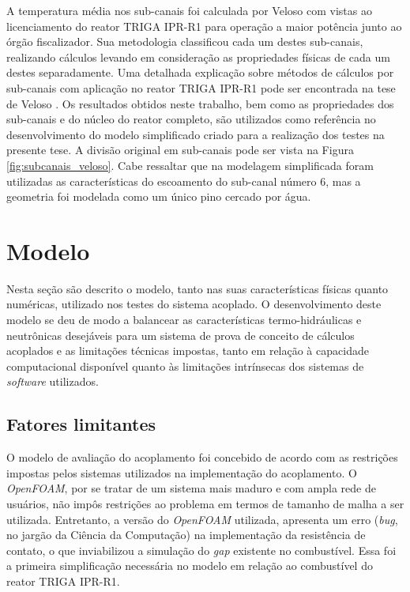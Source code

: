 A temperatura média nos sub-canais foi calculada por Veloso \cite[Capítulo~8]{Veloso2005} com vistas ao licenciamento
do reator TRIGA IPR-R1 para operação a maior potência junto ao órgão fiscalizador. Sua metodologia
classificou cada um destes sub-canais, realizando cálculos levando
em consideração as propriedades físicas de cada um destes separadamente. Uma detalhada
explicação sobre métodos de cálculos por sub-canais com aplicação no reator TRIGA IPR-R1
pode ser encontrada na tese de Veloso \cite{Veloso2004}. Os resultados obtidos neste
trabalho, bem como as propriedades dos sub-canais e do núcleo do reator completo, são utilizados
como referência no desenvolvimento do modelo simplificado criado para a realização dos testes na
presente tese. A divisão original em sub-canais pode ser vista na Figura \ref{fig:subcanais_veloso}. Cabe
ressaltar que na modelagem simplificada foram utilizadas as características do escoamento do
sub-canal número $6$, mas a geometria foi modelada como um único pino cercado por água.

\section{Modelo}
%
%

Nesta seção são descrito o modelo, tanto nas suas características físicas quanto numéricas, utilizado
nos testes do sistema acoplado.
O desenvolvimento deste modelo se deu de modo a balancear as características termo-hidráulicas
e neutrônicas desejáveis para um sistema de prova de conceito de cálculos acoplados
e as limitações técnicas impostas, tanto em relação à capacidade computacional disponível quanto
às limitações intrínsecas dos sistemas de \textit{software} utilizados.

\subsection{Fatores limitantes}
\label{ssec:lim}

O modelo de avaliação do acoplamento foi concebido de acordo com as restrições impostas pelos sistemas
utilizados na implementação do acoplamento. O \textit{OpenFOAM}, por se tratar de um sistema mais maduro
e com ampla rede de usuários, não impôs
restrições ao problema em termos de tamanho de malha a ser utilizada. Entretanto, a versão
do \textit{OpenFOAM} utilizada,
apresenta um erro (\textit{bug}, no jargão da Ciência da Computação) na implementação da resistência
de contato, o que inviabilizou a simulação do \textit{gap} existente no combustível. Essa foi a
primeira simplificação necessária no modelo em relação ao combustível do reator TRIGA IPR-R1.

